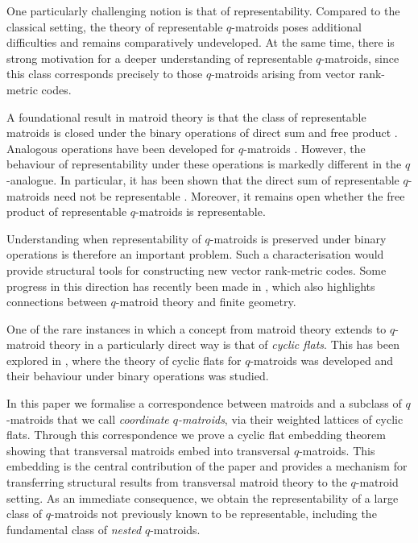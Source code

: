 \documentclass{article}
\theoremstyle{definition}
\begin{document}
One particularly challenging notion is that of representability. Compared to the classical setting, the theory of representable $q$-matroids poses additional difficulties and remains comparatively undeveloped. At the same time, there is strong motivation for a deeper understanding of representable $q$-matroids, since this class corresponds precisely to those $q$-matroids arising from vector rank-metric codes.

A foundational result in matroid theory is that the class of representable matroids is closed under the binary operations of direct sum and free product \cite{CrapoSchmitt2005,Oxley2011}. Analogous operations have been developed for $q$-matroids \cite{CeriaJurrius2024DirectSum, AlfaranoByrneFulcher2025}. However, the behaviour of representability under these operations is markedly different in the $q$-analogue. In particular, it has been shown that the direct sum of representable $q$-matroids need not be representable \cite{GluesingLuerssenJany2025}. Moreover, it remains open whether the free product of representable $q$-matroids is representable.

Understanding when representability of $q$-matroids is preserved under binary operations is therefore an important problem. Such a characterisation would provide structural tools for constructing new vector rank-metric codes. Some progress in this direction has recently been made in \cite{alfarano2026representability}, which also highlights connections between $q$-matroid theory and finite geometry.

One of the rare instances in which a concept from matroid theory extends to $q$-matroid theory in a particularly direct way is that of \emph{cyclic flats}. This has been explored in \cite{AlfaranoByrne2024CyclicFlats,AlfaranoByrneFulcher2025,GluesingLuerssenJany2024}, where the theory of cyclic flats for $q$-matroids was developed and their behaviour under binary operations was studied.

In this paper we formalise a correspondence between matroids and a subclass of $q$-matroids that we call \emph{coordinate $q$-matroids}, via their weighted lattices of cyclic flats. Through this correspondence we prove a cyclic flat embedding theorem showing that transversal matroids embed into transversal $q$-matroids. This embedding is the central contribution of the paper and provides a mechanism for transferring structural results from transversal matroid theory to the $q$-matroid setting. As an immediate consequence, we obtain the representability of a large class of $q$-matroids not previously known to be representable, including the fundamental class of \emph{nested} $q$-matroids.
\end{document}
